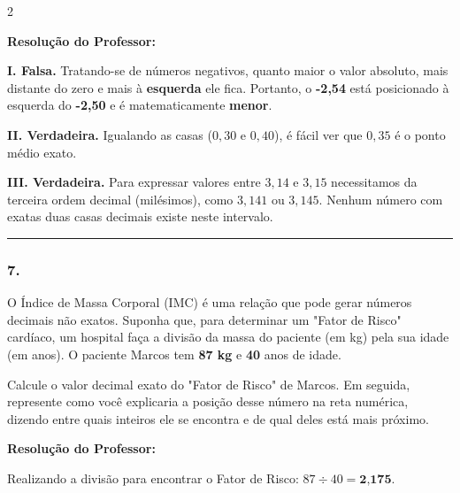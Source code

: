 \begin{multicols*}{2}
\ifgabarito
    \begin{tcolorbox}[colback=CorTitUm!5, colframe=CorTitUm, boxrule=1pt, arc=4pt, left=6pt, right=6pt, top=6pt, bottom=6pt]
    \small\textbf{\textcolor{CorTitUm}{Resolução do Professor:}}\par\vspace{0.1cm}
    \color{CinzaEscuro}
    \textbf{I. Falsa.} Tratando-se de números negativos, quanto maior o valor absoluto, mais distante do zero e mais à \textbf{esquerda} ele fica. Portanto, o \textbf{-2,54} está posicionado à esquerda do \textbf{-2,50} e é matematicamente \textbf{menor}.
    
    \textbf{II. Verdadeira.} Igualando as casas ($0,30$ e $0,40$), é fácil ver que $0,35$ é o ponto médio exato.
    
    \textbf{III. Verdadeira.} Para expressar valores entre $3,14$ e $3,15$ necessitamos da terceira ordem decimal (milésimos), como $3,141$ ou $3,145$. Nenhum número com exatas duas casas decimais existe neste intervalo.
    \end{tcolorbox}
\fi

\par\vspace{\espacoQuestao}

\noindent\textcolor{CorLinha}{\rule{\linewidth}{0.5pt}} 
\par\vspace{\espacoPreQuestao}
\subsubsection*{7.} O Índice de Massa Corporal (IMC) é uma relação que pode gerar números decimais não exatos. Suponha que, para determinar um "Fator de Risco" cardíaco, um hospital faça a divisão da massa do paciente (em kg) pela sua idade (em anos). O paciente Marcos tem \textbf{87 kg} e \textbf{40} anos de idade.

Calcule o valor decimal exato do "Fator de Risco" de Marcos. Em seguida, represente como você explicaria a posição desse número na reta numérica, dizendo entre quais inteiros ele se encontra e de qual deles está mais próximo.

\ifgabarito
    \begin{tcolorbox}[colback=CorTitUm!5, colframe=CorTitUm, boxrule=1pt, arc=4pt, left=6pt, right=6pt, top=6pt, bottom=6pt]
    \small\textbf{\textcolor{CorTitUm}{Resolução do Professor:}}\par\vspace{0.1cm}
    \color{CinzaEscuro}
    Realizando a divisão para encontrar o Fator de Risco: $87 \div 40 = \textbf{2,175}$.
    

\end{tcolorbox}
\end{multicols*}
